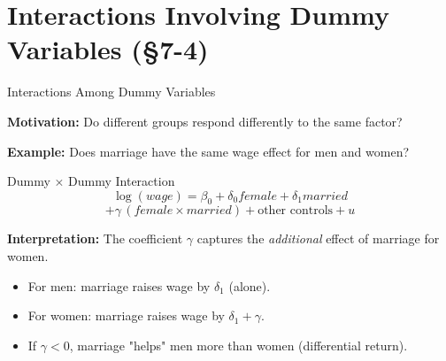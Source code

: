\documentclass[aspectratio=169, 12pt]{beamer}
\begin{document}
\section{Interactions Involving Dummy Variables (\S7-4)}

\begin{frame}[shrink=25]{Interactions Among Dummy Variables}

  \textbf{Motivation:} Do different groups respond differently to the same factor?

  \medskip

  \textbf{Example:} Does marriage have the same wage effect for men and women?

  \medskip

  \begin{definitionbox}{Dummy × Dummy Interaction}
    \[
      \log(\textit{wage}) = \beta_0 + \delta_0 \textit{female} + \delta_1 \textit{married}
    \]
    \[
      + \gamma \, (\textit{female} \times \textit{married}) + \text{other controls} + u
    \]
  \end{definitionbox}

  \medskip

  \textbf{Interpretation:} The coefficient $\gamma$ captures the \textit{additional} effect of marriage for women.

  \begin{keybox}
    \begin{itemize}
      \item For men: marriage raises wage by $\delta_1$ (alone).
      \item For women: marriage raises wage by $\delta_1 + \gamma$.
      \item If $\gamma < 0$, marriage "helps" men more than women (differential return).
    \end{itemize}
  \end{keybox}

\end{frame}
\end{document}
